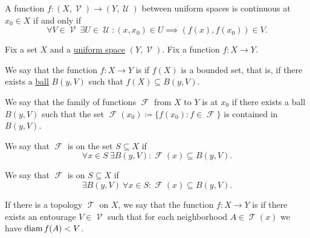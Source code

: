 \begin{corollary}\label{thm:uniform_space_local_continuity}
  A function \( f: (X, \mscrV) \to (Y, \mscrU) \) between uniform spaces is continuous at \( x_0 \in X \) if and only if
  \begin{equation*}
    \forall V \in \mscrV \ \exists U \in \mscrU : (x, x_0) \in U \implies (f(x), f(x_0)) \in V.
  \end{equation*}
\end{corollary}

\begin{definition}\label{def:bounded_function}
  Fix a set \( X \) and a \hyperref[def:uniform_space]{uniform space} \( (Y, \mscrV) \). Fix a function \( f: X \to Y \).

  \begin{defenum}
     We say that the function \( f: X \to Y \) is  if \( f(X) \) is a bounded set, that is, if there exists a \hyperref[def:entourage/ball]{ball} \( B(y, V) \) such that \( f(X) \subseteq B(y, V) \).

     We say that the family of functions \( \mscrF \) from \( X \) to \( Y \) is  at \( x_0 \) if there exists a ball \( B(y, V) \) such that the set \( \mscrF(x_0) \coloneqq \{ f(x_0) \colon f \in \mscrF \} \) is contained in \( B(y, V) \).

     We say that \( \mscrF \) is  on the set \( S \subseteq X \) if
    \begin{equation*}
      \forall x \in S \ \exists B(y, V) : \mscrF(x) \subseteq B(y, V).
    \end{equation*}

     We say that \( \mscrF \) is  on \( S \subseteq X \) if
    \begin{equation*}
      \exists B(y, V) \ \forall x \in S : \mscrF(x) \subseteq B(y, V).
    \end{equation*}

     If there is a topology \( \mscrT \) on \( X \), we say that the function \( f: X \to Y \) is  if there exists an entourage \( V \in \mscrV \) such that for each neighborhood \( A \in \mscrT(x) \) we have \( \operatorname{diam}{f(A)} < V \).
  \end{defenum}
\end{definition}

